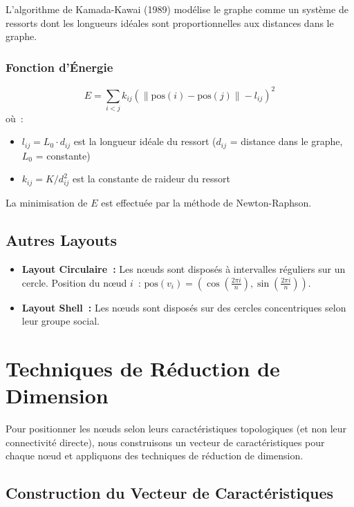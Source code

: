 \documentclass[12pt,a4paper]{article}
\begin{document}
L'algorithme de Kamada-Kawai (1989) modélise le graphe comme un système de ressorts dont les longueurs idéales sont proportionnelles aux distances dans le graphe.

\subsubsection{Fonction d'Énergie}

\[
    E = \sum_{i < j} k_{ij} \left( \|\text{pos}(i) - \text{pos}(j)\| - l_{ij} \right)^2
\]
où~:
\begin{itemize}
    \item $l_{ij} = L_0 \cdot d_{ij}$ est la longueur idéale du ressort ($d_{ij}$ = distance dans le graphe, $L_0$ = constante)
    \item $k_{ij} = K / d_{ij}^2$ est la constante de raideur du ressort
\end{itemize}

La minimisation de $E$ est effectuée par la méthode de Newton-Raphson.

\subsection{Autres Layouts}

\begin{itemize}
    \item \textbf{Layout Circulaire~:} Les n\oe{}uds sont disposés à intervalles réguliers sur un cercle. Position du n\oe{}ud $i$~: $\text{pos}(v_i) = (\cos(\frac{2\pi i}{n}), \sin(\frac{2\pi i}{n}))$.
    \item \textbf{Layout Shell~:} Les n\oe{}uds sont disposés sur des cercles concentriques selon leur groupe social.
\end{itemize}

\section{Techniques de Réduction de Dimension}
\label{sec:reduction}

Pour positionner les n\oe{}uds selon leurs caractéristiques topologiques (et non leur connectivité directe), nous construisons un vecteur de caractéristiques pour chaque n\oe{}ud et appliquons des techniques de réduction de dimension.

\subsection{Construction du Vecteur de Caractéristiques}
\end{document}
